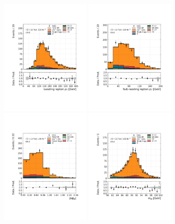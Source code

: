\begin{figure}[!htb]
    \centering
    \includegraphics[width=0.4\textwidth]{figures/search_hh/bkg_estimate/crvr/crzhf/crztest_l0_pt}
    \includegraphics[width=0.4\textwidth]{figures/search_hh/bkg_estimate/crvr/crzhf/crztest_l1_pt}
    \includegraphics[width=0.4\textwidth]{figures/search_hh/bkg_estimate/crvr/crzhf/crztest_dphi_ll}
    \includegraphics[width=0.4\textwidth]{figures/search_hh/bkg_estimate/crvr/crzhf/crztest_mll}

\end{figure}
